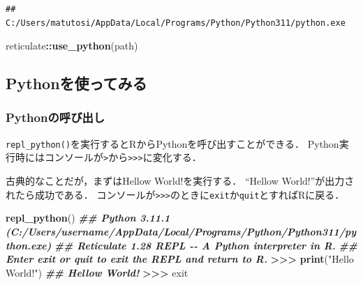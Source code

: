 \documentclass[
]{article}
\newenvironment{Shaded}{\begin{snugshade}}{\end{snugshade}}
\newcommand{\DocumentationTok}[1]{\textcolor[rgb]{0.56,0.35,0.01}{\textbf{\textit{#1}}}}
\newcommand{\ErrorTok}[1]{\textcolor[rgb]{0.64,0.00,0.00}{\textbf{#1}}}
\newcommand{\FunctionTok}[1]{\textcolor[rgb]{0.13,0.29,0.53}{\textbf{#1}}}
\newcommand{\NormalTok}[1]{#1}
\newcommand{\SpecialCharTok}[1]{\textcolor[rgb]{0.81,0.36,0.00}{\textbf{#1}}}
\newcommand{\StringTok}[1]{\textcolor[rgb]{0.31,0.60,0.02}{#1}}
\begin{document}
\begin{verbatim}
## C:/Users/matutosi/AppData/Local/Programs/Python/Python311/python.exe
\end{verbatim}

\begin{Shaded}
\begin{Highlighting}[]
\NormalTok{reticulate}\SpecialCharTok{::}\FunctionTok{use\_python}\NormalTok{(path)}
\end{Highlighting}
\end{Shaded}

\hypertarget{pythonux3092ux4f7fux3063ux3066ux307fux308b}{%
\subsection{Pythonを使ってみる}\label{pythonux3092ux4f7fux3063ux3066ux307fux308b}}

\hypertarget{pythonux306eux547cux3073ux51faux3057}{%
\subsubsection{Pythonの呼び出し}\label{pythonux306eux547cux3073ux51faux3057}}

\texttt{repl\_python()}を実行するとRからPythonを呼び出すことができる．
Python実行時にはコンソールが\texttt{\textgreater{}}から\texttt{\textgreater{}\textgreater{}\textgreater{}}に変化する．

古典的なことだが，まずはHellow World!を実行する．
``Hellow World!''が出力されたら成功である．
コンソールが\texttt{\textgreater{}\textgreater{}\textgreater{}}のときに\texttt{exit}か\texttt{quit}とすればRに戻る．

\begin{Shaded}
\begin{Highlighting}[]
\FunctionTok{repl\_python}\NormalTok{()}
\DocumentationTok{\#\# Python 3.11.1 (C:/Users/username/AppData/Local/Programs/Python/Python311/python.exe)}
\DocumentationTok{\#\# Reticulate 1.28 REPL {-}{-} A Python interpreter in R.}
\DocumentationTok{\#\# Enter \textquotesingle{}exit\textquotesingle{} or \textquotesingle{}quit\textquotesingle{} to exit the REPL and return to R.}
\SpecialCharTok{\textgreater{}}\ErrorTok{\textgreater{}\textgreater{}} \FunctionTok{print}\NormalTok{(}\StringTok{"Hello World!"}\NormalTok{)}
\DocumentationTok{\#\# Hellow World!}
\SpecialCharTok{\textgreater{}}\ErrorTok{\textgreater{}\textgreater{}}\NormalTok{ exit}
\end{Highlighting}
\end{Shaded}
\end{document}
